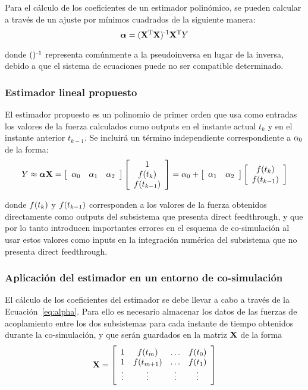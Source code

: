 Para el cálculo de los coeficientes de un estimador polinómico, se pueden calcular a través de un ajuste por mínimos cuadrados de la siguiente manera:
%
\begin{equation}
    \coefficients = (\estimation\trans \estimation)\inv \estimation\trans \estimated
    \label{eq:alpha}
\end{equation}

donde $()\inv$ representa comúnmente a la pseudoinversa en lugar de la inversa, debido a que el sistema de ecuaciones puede no ser compatible determinado.

\subsubsection{Estimador lineal propuesto}

El estimador propuesto es un polinomio de primer orden que usa como entradas los valores de la fuerza calculados como outputs en el instante actual $t_k$ y en el instante anterior $t_{k-1}$. Se incluirá un término independiente correspondiente a $\coefficient_0$ de la forma:
%
\begin{equation}
    \estimated \approx \coefficients \estimation = \sqbr{\hvect{ccc}{\coefficient_0 & \coefficient_1 & \coefficient_2}} \sqbr{\cvvect{1 \\ \forceMod (t_k) \\ \forceMod (t_{k-1})}} = \coefficient_0 + \sqbr{\hvect{cc}{\coefficient_1 & \coefficient_2}} \sqbr{\cvvect{\forceMod (t_k) \\ \forceMod (t_{k-1})}}
\end{equation}

donde $\forceMod (t_k)$ y $\forceMod (t_{k-1})$ corresponden a los valores de la fuerza obtenidos directamente como outputs del subsistema que presenta direct feedthrough, y que por lo tanto introducen importantes errores en el esquema de co-simulación al usar estos valores como inputs en la integración numérica del subsistema que no presenta direct feedthrough.


\subsubsection{Aplicación del estimador en un entorno de co-simulación}

El cálculo de los coeficientes del estimador se debe llevar a cabo a través de la Ecuación~\eqref{eq:alpha}. Para ello es necesario almacenar los datos de las fuerzas de acoplamiento entre los dos subsistemas para cada instante de tiempo obtenidos durante la co-simulación, y que serán guardados en la matriz $\estimation$ de la forma
%
\begin{equation}
    \estimation = \sqbr{\matr{cccc}
    {1 & \forceMod (t_m) & \dots &\forceMod (t_0) \\
    1 & \forceMod (t_{m+1}) & \dots & \forceMod (t_1) \\
    \vdots & \vdots & \vdots &\vdots}} 
\end{equation}

